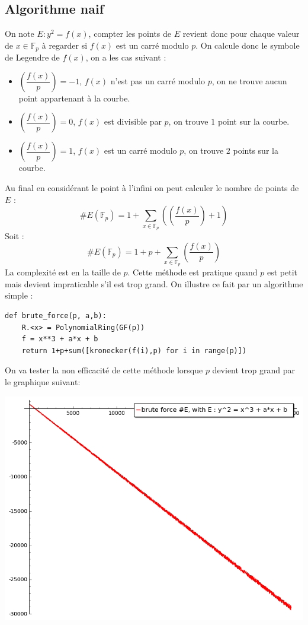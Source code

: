 \documentclass{article}
\begin{document}
\subsection{Algorithme naif}
On note $E: y^2 = f(x)$, compter les points de $E$ revient donc pour chaque valeur de $x \in \mathbb{F}_p$ à regarder si $f(x)$ est un carré modulo $p$. On calcule donc le symbole de Legendre de $f(x)$, on a les cas suivant : 
\begin{itemize}
\item  $\genfrac(){}{0}{f(x)}{p} = -1$, $f(x)$ n'est pas un carré modulo $p$, on ne trouve aucun point appartenant à la courbe.
\item $\genfrac(){}{0}{f(x)}{p} = 0$, $f(x)$ est divisible par $p$, on trouve $1$ point sur la courbe.
\item $\genfrac(){}{0}{f(x)}{p} = 1$, $f(x)$ est un carré modulo $p$, on trouve $2$ points sur la courbe.
\end{itemize}
\medskip
Au final en considérant le point à l'infini on peut calculer le nombre de points de $E$ : 
\begin{equation*}
\#E(\mathbb{F}_p) = 1 + \sum_{x \in \mathbb{F}_p}(\genfrac(){}{0}{f(x)}{p} + 1)
\end{equation*}
Soit : 
\begin{equation}
\#E(\mathbb{F}_p) = 1 + p +\sum_{x \in \mathbb{F}_p}\genfrac(){}{0}{f(x)}{p}
\end{equation}
La complexité est en la taille de $p$. Cette méthode est pratique quand $p$ est petit mais devient impraticable s'il est trop grand. On illustre ce fait par un algorithme simple :
\medskip
\begin{lstlisting}
def brute_force(p, a,b):
    R.<x> = PolynomialRing(GF(p))
    f = x**3 + a*x + b
    return 1+p+sum([kronecker(f(i),p) for i in range(p)])

\end{lstlisting}

On va tester la non efficacité de cette méthode lorsque $p$ devient trop grand par le graphique suivant:

\includegraphics[scale=0.5]{pictures/brute_force_cputime.png} 
\end{document}
